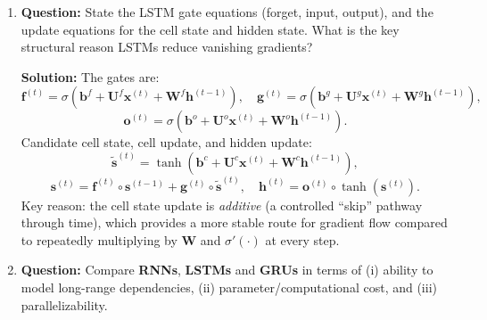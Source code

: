 \documentclass{article}
\begin{document}
\begin{enumerate}
    \item \textbf{Question:}
    State the LSTM gate equations (forget, input, output), and the update equations for the cell state and hidden state. What is the key structural reason LSTMs reduce vanishing gradients?

    \textbf{Solution:}
    The gates are:
    \[
    \mathbf{f}^{(t)}=\sigma(\mathbf{b}^f+\mathbf{U}^f\mathbf{x}^{(t)}+\mathbf{W}^f\mathbf{h}^{(t-1)}),\quad
    \mathbf{g}^{(t)}=\sigma(\mathbf{b}^g+\mathbf{U}^g\mathbf{x}^{(t)}+\mathbf{W}^g\mathbf{h}^{(t-1)}),
    \]
    \[
    \mathbf{o}^{(t)}=\sigma(\mathbf{b}^o+\mathbf{U}^o\mathbf{x}^{(t)}+\mathbf{W}^o\mathbf{h}^{(t-1)}).
    \]
    Candidate cell state, cell update, and hidden update:
    \[
    \tilde{\mathbf{s}}^{(t)}=\tanh(\mathbf{b}^c+\mathbf{U}^c\mathbf{x}^{(t)}+\mathbf{W}^c\mathbf{h}^{(t-1)}),
    \]
    \[
    \mathbf{s}^{(t)}=\mathbf{f}^{(t)}\circ \mathbf{s}^{(t-1)}+\mathbf{g}^{(t)}\circ \tilde{\mathbf{s}}^{(t)},\quad
    \mathbf{h}^{(t)}=\mathbf{o}^{(t)}\circ\tanh(\mathbf{s}^{(t)}).
    \]
    Key reason: the cell state update is \emph{additive} (a controlled “skip” pathway through time), which provides a more stable route for gradient flow compared to repeatedly multiplying by $\mathbf{W}$ and $\sigma'(\cdot)$ at every step.


    
    \item \textbf{Question:}
    Compare \textbf{RNNs}, \textbf{LSTMs} and \textbf{GRUs} in terms of (i) ability to model long-range dependencies, (ii) parameter/computational cost, and (iii) parallelizability.
    

\end{enumerate}
\end{document}
